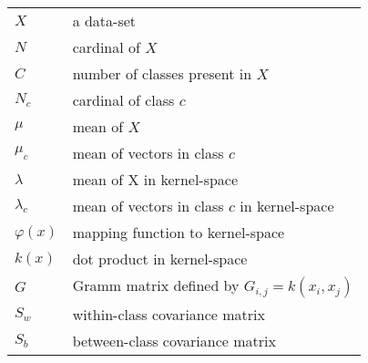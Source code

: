 
\begin{tabular}{ll}
$X$ & a data-set \\
$N$ & cardinal of $X$ \\
$C$ & number of classes present in $X$ \\
$N_c$ & cardinal of class $c$ \\
$\mu$ & mean of $X$ \\
$\mu_c$ & mean of vectors in class $c$ \\
$\lambda$ & mean of X in kernel-space \\
$\lambda_c$ & mean of vectors in class $c$ in kernel-space \\
$\varphi(x)$ & mapping function to kernel-space \\
$k(x)$ & dot product in kernel-space \\
$G$ & Gramm matrix defined by $G_{i,j} = k(x_i, x_j)$ \\
$S_w$ & within-class covariance matrix \\
$S_b$ & between-class covariance matrix
\end{tabular}
